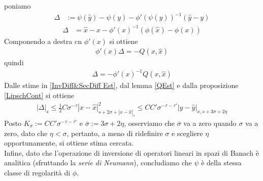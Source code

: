 \documentclass[twoside, 11pt]{amsbook}
\makeatletter
\newcommand{\0}{{(0)}}
\newcommand{\3}{{(3)}}
\theoremstyle{colonplain}
\theoremstyle{colondefinition}
\theoremstyle{colonremark}
\numberwithin{equation}{chapter}
\renewcommand{\proofname}{Dimostrazione}
\renewenvironment{proof}[1][\proofname]{\par
  \pushQED{\qed}%
  \normalfont \topsep6\p@\@plus6\p@\relax
  \trivlist
  \item[\hskip\labelsep\bfseries #1:]\ignorespaces
}{%
  \popQED\endtrivlist\@endpefalse
}
\makeatother
\begin{document}
\begin{proof} poniamo
\begin{align}
    \Delta &:= \psi(\hat{y}) - \psi(y) - \phi'(\psi(y))^{-1}(\hat{y} - y)
\end{align}
\begin{align}
    \Delta &= \hat{x} - x - \phi'(x)^{-1}(\phi(\hat{x}) - \phi(x))
\end{align}
Componendo a destra cn $\phi'(x)$ si ottiene
\begin{align}
    \phi'(x)\Delta = -Q(x, \hat{x})
\end{align}
quindi
\begin{align}
    \Delta = -\phi'(x)^{-1}Q(x, \hat{x})
\end{align}
Dalle stime in \eqref{InvDiff&SecDiff Est}, dal lemma \ref{QEst} e dalla proposizione \eqref{LipschCont} si ottiene
\begin{align}
    |\Delta|_s \leq \frac{1}{2}C\sigma^{-\tau}|x - \hat{x}|^2_{s + 2\sigma + |x - \hat{x}|_s} \leq CC'\sigma^{-\tau - \tau'}|y - \hat{y}|_{x, s + 3\sigma + 2\eta}
\end{align}
Posto $K_\sigma := CC'\sigma^{-\tau - \tau'}$ e $\overline{\sigma} := 3\sigma + 2\eta$, osserviamo che $\overline{\sigma}$ va a zero quando $\sigma$ va a zero, dato che $\eta < \sigma$, pertanto, a meno di ridefinire $\sigma$ e scegliere $\eta$ opportunamente, si ottiene stima cercata. \\
Infine, dato che l'operazione di inversione di operatori lineari in spazi di Banach è analitica (sfruttando la \textit{serie di Neumann}), concludiamo che $\psi$ è della stessa classe di regolarità di $\phi$. \end{proof}

\backmatter
\let\appendixname\empty
\def\chaptername{\bibname}



\end{document}
